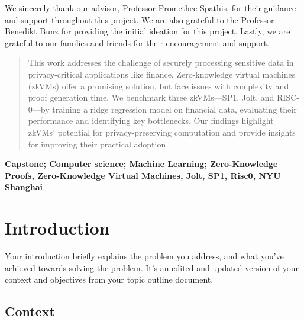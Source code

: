 \documentclass{scrartcl}
\begin{document}
\vspace{1cm}

\begin{acknowledgements}
We sincerely thank our advisor, Professor Promethee Spathis, for their guidance and support throughout this project. We are also grateful to the Professor Benedikt Bunz for providing the initial ideation for this project. Lastly, we are grateful to our families and friends for their encouragement and support.\end{acknowledgements}

\newpage

\begin{abstract}
This work addresses the challenge of securely processing sensitive data in privacy-critical applications like finance. Zero-knowledge virtual machines (zkVMs) offer a promising solution, but face issues with complexity and proof generation time. We benchmark three zkVMs—SP1, Jolt, and RISC-0—by training a ridge regression model on financial data, evaluating their performance and identifying key bottlenecks. Our findings highlight zkVMs’ potential for privacy-preserving computation and provide insights for improving their practical adoption.
\end{abstract}
\vspace{1cm}

\begin{keywords}
\centering
         \textbf{Capstone; Computer science; Machine Learning; Zero-Knowledge Proofs, Zero-Knowledge Virtual Machines, Jolt, SP1, Risc0, NYU Shanghai}
\end{keywords}

\newpage



\doublespacing
\tableofcontents
\singlespacing

\newpage

\doublespacing

\section{Introduction}

Your introduction briefly explains the problem you address, and what you've achieved towards solving the problem. It's an edited and updated version of your context and objectives from your topic outline document.

\subsection{Context}
\end{document}
